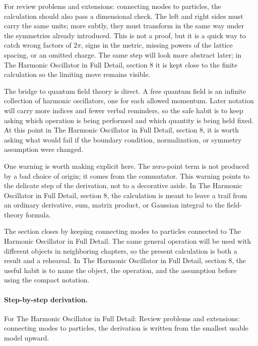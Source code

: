 For review problems and extensions: connecting modes to particles, the calculation should also pass a dimensional check.  The left and right sides must carry the same units; more subtly, they must transform in the same way under the symmetries already introduced.  This is not a proof, but it is a quick way to catch wrong factors of \(2\pi\), signs in the metric, missing powers of the lattice spacing, or an omitted charge.  The same step will look more abstract later; in The Harmonic Oscillator in Full Detail, section 8 it is kept close to the finite calculation so the limiting move remains visible.

The bridge to quantum field theory is direct.  A free quantum field is an infinite collection of harmonic oscillators, one for each allowed momentum.  Later notation will carry more indices and fewer verbal reminders, so the safe habit is to keep asking which operation is being performed and which quantity is being held fixed.  At this point in The Harmonic Oscillator in Full Detail, section 8, it is worth asking what would fail if the boundary condition, normalization, or symmetry assumption were changed.

One warning is worth making explicit here.  The zero-point term is not produced by a bad choice of origin; it comes from the commutator.  This warning points to the delicate step of the derivation, not to a decorative aside.  In The Harmonic Oscillator in Full Detail, section 8, the calculation is meant to leave a trail from an ordinary derivative, sum, matrix product, or Gaussian integral to the field-theory formula.

The section closes by keeping connecting modes to particles connected to The Harmonic Oscillator in Full Detail.  The same general operation will be used with different objects in neighboring chapters, so the present calculation is both a result and a rehearsal.  In The Harmonic Oscillator in Full Detail, section 8, the useful habit is to name the object, the operation, and the assumption before using the compact notation.



\paragraph{Step-by-step derivation.}

For The Harmonic Oscillator in Full Detail: Review problems and extensions: connecting modes to particles, the derivation is written from the smallest usable model upward.

